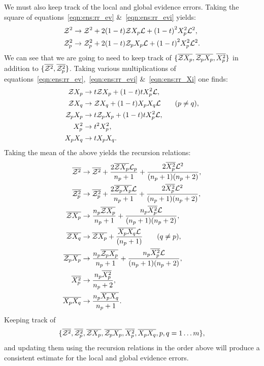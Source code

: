 We must also keep track of the local and global evidence errors. Taking the square of equations~\eqref{eqn:ens:rr_ev} \&~\eqref{eqn:ens:rr_evi} yields:
%
\begin{align}
  \mathcal{Z}^2 &\to \mathcal{Z}^2 + 2 (1-t) \mathcal{Z} X_p \mathcal{L} +  {(1-t)}^2 X_p^2 \mathcal{L}^2, \\
  \mathcal{Z}_p^2 &\to \mathcal{Z}_p^2 + 2 (1-t) \mathcal{Z}_p X_p \mathcal{L} +  {(1-t)}^2 X_p^2 \mathcal{L}^2.
\end{align}
%
We can see that we are going to need to keep track of \(\{\overline{\mathcal{Z} X_p}, \overline{\mathcal{Z}_p X_p}, \overline{X_p^2}\}\) in addition to \(\{ \overline{\mathcal{Z}^2}, \overline{\mathcal{Z}_p^2} \}\). Taking various multiplications of equations~\eqref{eqn:ens:rr_ev},~\eqref{eqn:ens:rr_evi} \&~\eqref{eqn:ens:rr_Xi} one finds:
%
\begin{align}
  \mathcal{Z} X_p   &\to t \mathcal{Z} X_p + (1-t)t X_p^2 \mathcal{L}, \\
  \mathcal{Z} X_q   &\to   \mathcal{Z} X_q + (1-t) X_p X_q \mathcal{L} \qquad (p\ne q),   \\
  \mathcal{Z}_p X_p &\to t \mathcal{Z}_p X_p + (1-t)t X_p^2 \mathcal{L}, \\
  X_p^2     &\to t^2 X_p^2, \\
  X_p X_q   &\to t   X_p X_q.
\end{align}
%
Taking the mean of the above yields the recursion relations:
\begin{align}
  \overline{\mathcal{Z}^2} &\to \overline{\mathcal{Z}^2} + \frac{2\overline{\mathcal{Z} X_p}\mathcal{L}_p}{n_p+1}  + \frac{2\overline{X_p^2}\mathcal{L}^2}{(n_p+1)(n_p+2)}, \\
  \overline{\mathcal{Z}_p^2} &\to \overline{\mathcal{Z}_p^2} + \frac{2\overline{\mathcal{Z}_p X_p}\mathcal{L}}{n_p+1}  + \frac{2\overline{X_p^2}\mathcal{L}^2}{(n_p+1)(n_p+2)}, \\
  \overline{\mathcal{Z} X_p} &\to \frac{n_p\overline{\mathcal{Z} X_p}}{n_p+1}  + \frac{n_p\overline{X_p^2} \mathcal{L}}{(n_p+1)(n_p+2)},   \\
  \overline{\mathcal{Z} X_q} &\to \overline{\mathcal{Z} X_p}  + \frac{\overline{X_p X_q} \mathcal{L}}{(n_p+1)} \qquad (q\ne p),  \\
  \overline{\mathcal{Z}_p X_p} &\to \frac{n_p\overline{\mathcal{Z}_p X_p}}{n_p+1}  + \frac{n_p\overline{X_p^2} \mathcal{L}}{(n_p+1)(n_p+2)},   \\
  \overline{X_p^2} &\to \frac{n_p\overline{X_p^2}}{n_p+2}, \\
  \overline{X_p X_q} &\to \frac{n_p\overline{X_p X_q}}{n_p+1}.
\end{align}
Keeping track of 
\[\{\overline{\mathcal{Z}^2},\overline{\mathcal{Z}_p^2},\overline{\mathcal{Z} X_p},\overline{\mathcal{Z}_p X_p},\overline{X_p^2},\overline{X_p X_q},p,q=1\ldots m\},\]
and updating them using the recursion relations in the order above will produce a consistent estimate for the local and global evidence errors.



